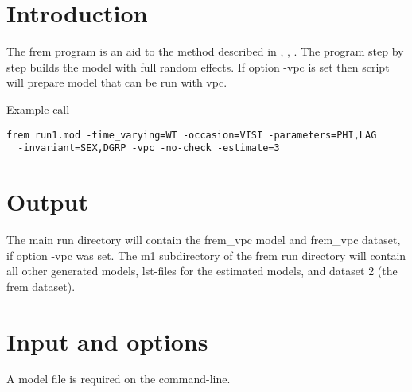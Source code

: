 



\newcommand{\guidetoolname}{frem}

\maketitle


\section{Introduction}
The frem program is an aid to the method described in \cite{Karlsson}, \cite{Ivaturi}, \cite{Yun}.
The program step by step builds the model with full random effects.
If option -vpc is set then script will prepare model that can be run with vpc.


Example call
\begin{verbatim}
frem run1.mod -time_varying=WT -occasion=VISI -parameters=PHI,LAG 
  -invariant=SEX,DGRP -vpc -no-check -estimate=3
\end{verbatim}

\section{Output}
The main run directory will contain the frem\_vpc model and frem\_vpc dataset, if option -vpc was set.
The m1 subdirectory of the frem run directory will contain all other generated models, 
lst-files for the estimated models, and dataset 2 (the frem dataset). 

\section{Input and options}
A model file is required on the command-line.

